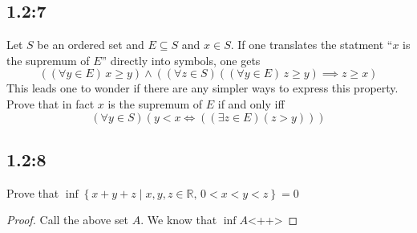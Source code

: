 \documentclass[11pt]{article}
\newcommand{\R}{\mathbb{R}}
\newenvironment{bp}{\color{blue}\begin{proof}}{\end{proof}}
\renewcommand{\subset}{\subseteq}
\begin{document}
\subsection*{1.2:7}
Let $S$ be an ordered set and $E\subset S$ and $x\in S$. If one translates the statment ``$x$ is the supremum of $E$'' directly into symbols, one gets \[((\forall y\in E)\, x\geq y)\land ((\forall z\in S)((\forall y\in E)\, z\geq y)\implies z\geq x)\] This leads one to wonder if there are any simpler ways to express this property. Prove that in fact $x$ is the supremum of $E$ if and only iff \[(\forall y\in S)(y<x\iff ((\exists z\in E)(z > y)))\]
\subsection*{1.2:8}
Prove that $\inf \left\{ x + y + z\mid x,y,z\in \R,\, 0<x<y<z \right\} = 0$
\begin{bp}
  Call the above set $A$. We know that $\inf A $<++>
\end{bp}<++>
\end{document}
